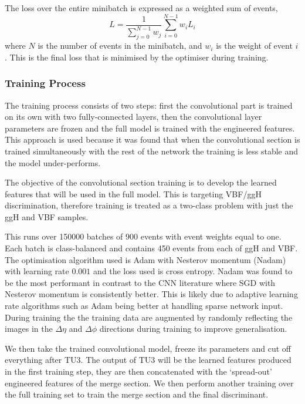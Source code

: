 The loss over the entire minibatch is expressed as a weighted sum of events,
\begin{equation}
    L = \frac{1}{\sum_{j=0}^{N-1}w_{j}}\sum_{i=0}^{N-1}w_{i}L_{i}
\end{equation} 
where $N$ is the number of events in the minibatch, and $w_i$ is the weight of event $i$.
This is the final loss that is minimised by the optimiser during training. 



\subsubsection{Training Process}
The training process consists of two steps: first the convolutional part is trained on its own with two fully-connected layers, then the convolutional layer parameters are frozen and the full model is trained with the engineered features. This approach is used because it was found that when the convolutional section is trained simultaneously with the rest of the network the training is less stable and the model under-performs.

The objective of the convolutional section training is to develop the learned features that will be used in the full model. 
This is targeting VBF/ggH discrimination, therefore training is treated as a two-class problem with just the ggH and VBF samples.  

This runs over 150000 batches of 900 events with event weights equal to one. Each batch is class-balanced and contains 450 events from each of ggH and VBF.  
The optimisation algorithm used is Adam with Nesterov momentum (Nadam) with learning rate $0.001$ and the loss used is cross entropy. 
Nadam was found to be the most performant in contrast to the CNN literature where SGD with Nesterov momentum is consistently better. 
This is likely due to adaptive learning rate algorithms such as Adam being better at handling sparse network input. 
During training the the training data are augmented by randomly reflecting the images in the $\Delta\eta$ and $\Delta\phi$ directions during training to improve generalisation. 


We then take the trained convolutional model, freeze its parameters and cut off everything after TU3. 
The output of TU3 will be the learned features produced in the first training step, they are then concatenated with the `spread-out' engineered features of the merge section.
We then perform another training over the full training set to train the merge section and the final discriminant. 

